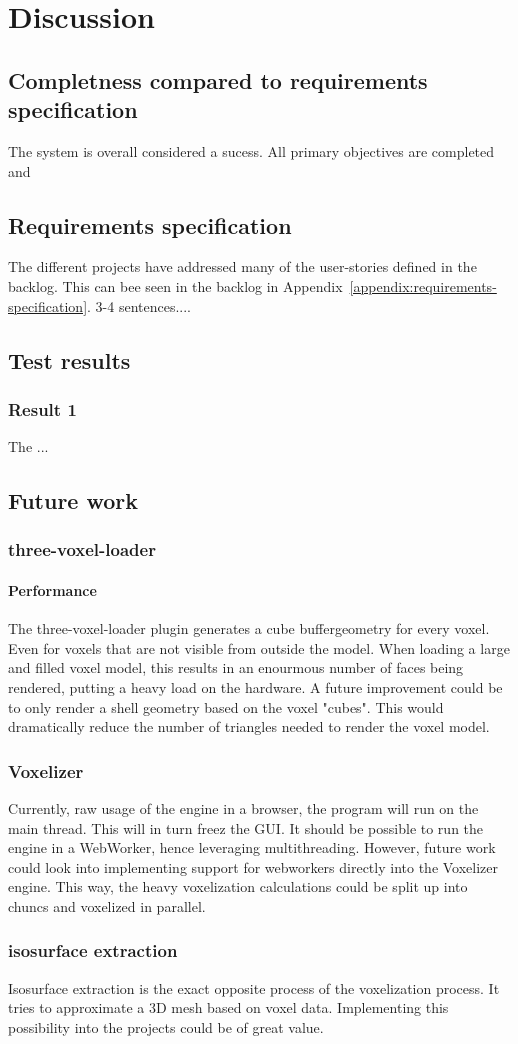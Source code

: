 \chapter{Discussion}
\section{Completness compared to requirements specification}
The system is overall considered a sucess. All primary objectives are completed and 

\section{Requirements specification}
The different projects have addressed many of the user-stories defined in the backlog. This can bee seen in the backlog in Appendix~\ref{appendix:requirements-specification}. 3-4 sentences....
\section{Test results}

\subsection{Result 1}\label{platformDesAndBuo}
The ...
\section{Future work}

\subsection{three-voxel-loader}
\subsubsection{Performance}
The three-voxel-loader plugin generates a cube buffergeometry for every voxel. Even for voxels that are not visible from outside the model. When loading a large and filled voxel model, this results in an enourmous number of faces being rendered, putting a heavy load on the hardware. A future improvement could be to only render a shell geometry based on the voxel "cubes". This would dramatically reduce the number of triangles needed to render the voxel model.

\subsection{Voxelizer}
Currently, raw usage of the engine in a browser, the program will run on the main thread. This will in turn freez the GUI. It should be possible to run the engine in a WebWorker, hence leveraging multithreading. However, future work could look into implementing support for webworkers directly into the Voxelizer engine. This way, the heavy voxelization calculations could be split up into chuncs and voxelized in parallel.

\subsection{isosurface extraction}
Isosurface extraction is the exact opposite process of the voxelization process. It tries to approximate a 3D mesh based on voxel data. Implementing this possibility into the projects could be of great value.




